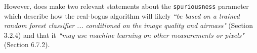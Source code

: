 However,  does make two relevant statements about the {\tt spuriousness} parameter which describe how the real-bogus algorithm will likely {\it ``be based on a trained random forest classifier ... conditioned on the image quality and airmass"} (Section 3.2.4) and that it  {\it ``may use machine learning on other measurements or pixels"} (Section 6.7.2).





